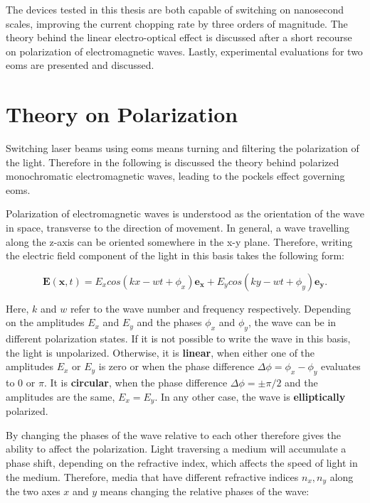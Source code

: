 The devices tested in this thesis are both capable of switching on nanosecond scales, improving the current chopping rate by three orders of magnitude. The theory behind the linear electro-optical effect is discussed after a short recourse on polarization of electromagnetic waves. Lastly, experimental evaluations for two \acp{eom} are presented and discussed.



\section{Theory on Polarization}

\label{sec:pol}

Switching laser beams using \acp{eom} means turning and filtering the polarization of the light. Therefore in the following is discussed the theory behind polarized monochromatic electromagnetic waves, leading to the pockels effect governing \acp{eom}.

Polarization of electromagnetic waves is understood as the orientation of the wave in space, transverse to the direction of movement. In general, a wave travelling along the z-axis can be oriented somewhere in the x-y plane. Therefore, writing the electric field component of the light in this basis takes the following form:

\begin{equation}
	\mathbf{E}(\mathbf{x}, t) = E_x cos\left(kx - wt + \phi_x\right) \mathbf{e_x} + E_y cos\left(ky - wt + \phi_y\right) \mathbf{e_y}.
\end{equation}

Here, $k$ and $w$ refer to the wave number and frequency respectively.
Depending on the amplitudes $E_x$ and $E_y$ and the phases $\phi_x$ and $\phi_y$, the wave can be in different polarization states. If it is not possible to write the wave in this basis, the light is unpolarized. Otherwise, it is \textbf{linear}, when either one of the amplitudes $E_x$ or $E_y$ is zero or when the phase difference $\Delta \phi = \phi_x - \phi_y$ evaluates to 0 or $\pi$. It is \textbf{circular}, when the phase difference $\Delta \phi = \pm \pi/2$ and the amplitudes are the same, $E_x = E_y$. In any other case, the wave is \textbf{elliptically} polarized.

By changing the phases of the wave relative to each other therefore gives the ability to affect the polarization. Light traversing a medium will accumulate a phase shift, depending on the refractive index, which affects the speed of light in the medium. Therefore, media that have different refractive indices $n_x, n_y$ along the two axes $x$ and $y$ means changing the relative phases of the wave:

